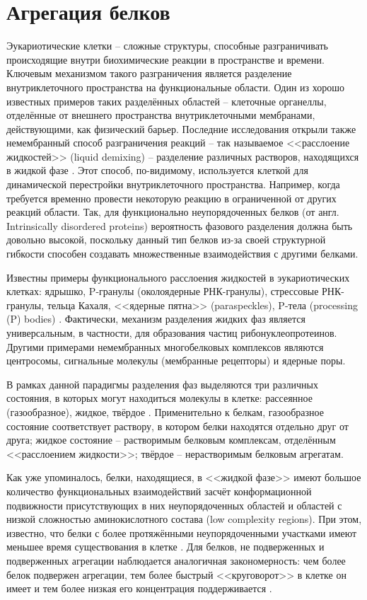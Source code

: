 \section{Агрегация белков} \label{sect_aggregation}

Эукариотические клетки -- сложные структуры, способные разграничивать происходящие внутри биохимические реакции в пространстве и времени. Ключевым механизмом такого разграничения является разделение внутриклеточного пространства на функциональные области. Один из хорошо известных примеров таких разделённых областей -- клеточные органеллы, отделённые от внешнего пространства внутриклеточными мембранами, действующими, как физический барьер. Последние исследования открыли также немембранный способ разграничения реакций -- так называемое <<расслоение жидкостей>> (liquid demixing) -- разделение различных растворов, находящихся в жидкой фазе \cite{Aguzzi2016}. Этот способ, по-видимому, используется клеткой для динамической перестройки внутриклеточного пространства. Например, когда требуется временно провести некоторую реакцию в ограниченной от других реакций области. Так, для функционально неупорядоченных белков (от англ. Intrinsically disordered proteins) вероятность фазового разделения должна быть довольно высокой, поскольку данный тип белков из-за своей структурной гибкости способен создавать множественные взаимодействия с другими белками.

Известны примеры функционального расслоения жидкостей в эукариотических клетках: ядрышко, P-гранулы (околоядерные РНК-гранулы), стрессовые РНК-гранулы, тельца Кахаля, <<ядерные пятна>> (paraspeckles), P-тела (processing (P) bodies) \cite{Aguzzi2016}. Фактически, механизм разделения жидких фаз является универсальным, в частности, для образования частиц рибонуклеопротеинов. Другими примерами немембранных многобелковых комплексов являются центросомы, сигнальные молекулы (мембранные рецепторы) и ядерные поры.

В рамках данной парадигмы разделения фаз выделяются три различных состояния, в которых могут находиться молекулы в клетке: рассеянное (газообразное), жидкое, твёрдое \cite{Aguzzi2016}. Применительно к белкам, газообразное состояние соответствует раствору, в котором белки находятся отдельно друг от друга; жидкое состояние -- растворимым белковым комплексам, отделённым <<расслоением жидкости>>; твёрдое -- нерастворимым белковым агрегатам.

Как уже упоминалось, белки, находящиеся, в <<жидкой фазе>> имеют большое количество функциональных взаимодействий засчёт конформационной подвижности присутствующих в них неупорядоченных областей и областей с низкой сложностью аминокислотного состава (low complexity regions). При этом, известно, что белки с более протяжёнными неупорядоченными участками имеют меньшее время существования в клетке \cite{VanderLee2014}. Для белков, не подверженных и подверженных агрегации наблюдается аналогичная закономерность: чем более белок подвержен агрегации, тем более быстрый <<круговорот>> в клетке он имеет и тем более низкая его концентрация поддерживается \cite{Gsponer2012}.

